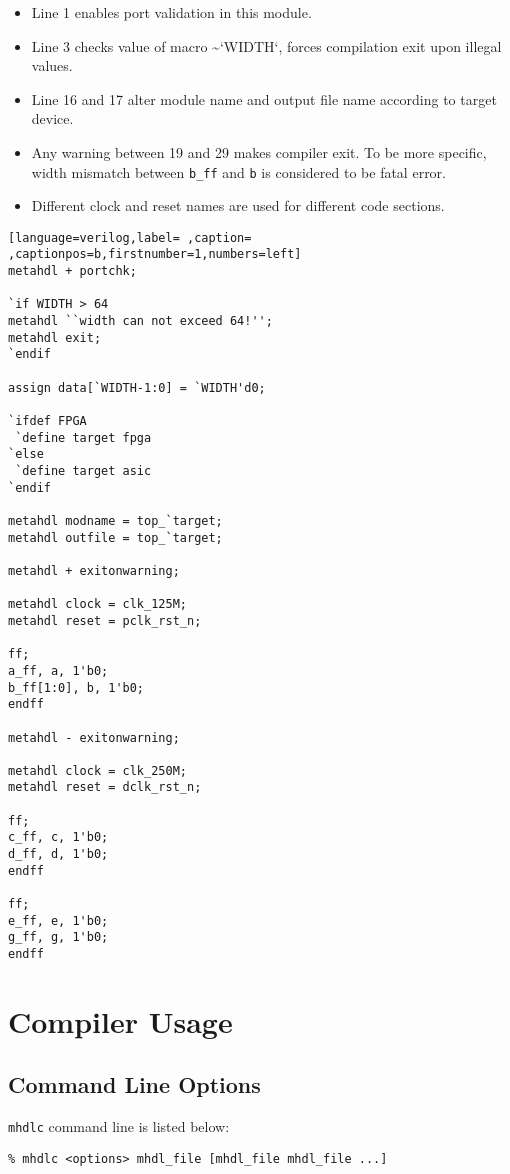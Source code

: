 \documentclass[10pt,oneside]{book}
\begin{document}
\begin{itemize}
\item Line 1 enables port validation in this module.
\item Line 3 checks value of macro \textasciitilde{}`WIDTH`, forces compilation exit upon
illegal values.
\item Line 16 and 17 alter module name and output file name according to
target device.
\item Any warning between 19 and 29 makes compiler exit.  To be more
specific, width mismatch between \texttt{b\_ff} and \texttt{b} is considered to be
fatal error.
\item Different clock and reset names are used for different code sections.
\end{itemize}

\begin{lstlisting}[language=verilog,label= ,caption= ,captionpos=b,firstnumber=1,numbers=left]
metahdl + portchk;

`if WIDTH > 64
metahdl ``width can not exceed 64!'';
metahdl exit;
`endif

assign data[`WIDTH-1:0] = `WIDTH'd0;

`ifdef FPGA
 `define target fpga
`else
 `define target asic
`endif

metahdl modname = top_`target;
metahdl outfile = top_`target;

metahdl + exitonwarning;

metahdl clock = clk_125M;
metahdl reset = pclk_rst_n;

ff;
a_ff, a, 1'b0;
b_ff[1:0], b, 1'b0;
endff

metahdl - exitonwarning;

metahdl clock = clk_250M;
metahdl reset = dclk_rst_n;

ff;
c_ff, c, 1'b0;
d_ff, d, 1'b0;
endff

ff;
e_ff, e, 1'b0;
g_ff, g, 1'b0;
endff
\end{lstlisting}


\chapter{Compiler Usage}
\label{sec:org32ec4ba}
\section{Command Line Options}
\label{sec:orgcd94bb9}
\texttt{mhdlc} command line is listed below:
\begin{verbatim}
% mhdlc <options> mhdl_file [mhdl_file mhdl_file ...]
\end{verbatim}
\end{document}
